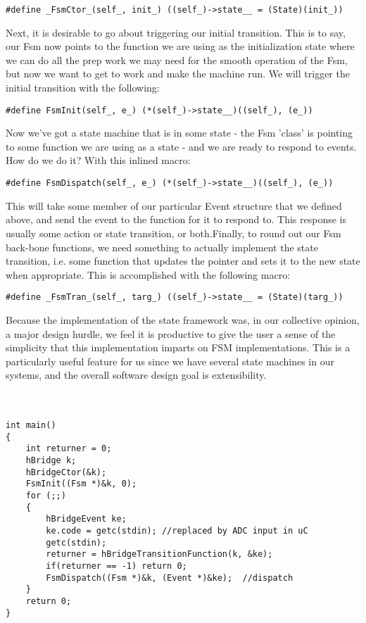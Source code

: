 \begin{lstlisting}
#define _FsmCtor_(self_, init_) ((self_)->state__ = (State)(init_))
\end{lstlisting}

Next, it is desirable to go about triggering our initial transition. This is to say, our Fsm now points to the function we are using as the initialization state where we can do all the prep work we may need for the smooth operation of the Fsm, but now we want to get to work and make the machine run. We will trigger the initial transition with the following:

\begin{lstlisting}
#define FsmInit(self_, e_) (*(self_)->state__)((self_), (e_))
\end{lstlisting}

Now we've got a state machine that is in some state - the Fsm 'class' is pointing to some function we are using as a state - and we are ready to respond to events. How do we do it? With this inlined macro:

\begin{lstlisting}
#define FsmDispatch(self_, e_) (*(self_)->state__)((self_), (e_))
\end{lstlisting}


This will take some member of our particular Event structure that we defined above, and send the event to the function for it to respond to. This response is usually some action or state transition, or both.Finally, to round out our Fsm back-bone functions, we need something to actually implement the state transition, i.e. some function that updates the pointer and sets it to the new state when appropriate. This is accomplished with the following macro:
\begin{lstlisting}
#define _FsmTran_(self_, targ_) ((self_)->state__ = (State)(targ_))
\end{lstlisting}
Because the implementation of the state framework was, in our collective opinion, a major design hurdle, we feel it is productive to give the user a sense of the simplicity that this implementation imparts on FSM implementations. This is a particularly useful feature for us since we have several state machines in our systems, and the overall software design goal is extensibility.  
\\
\\
\\
\begin{lstlisting}
int main()
{
    int returner = 0;
    hBridge k;
    hBridgeCtor(&k);
    FsmInit((Fsm *)&k, 0);
    for (;;)
    {
        hBridgeEvent ke;                   
        ke.code = getc(stdin); //replaced by ADC input in uC           
        getc(stdin);                      
        returner = hBridgeTransitionFunction(k, &ke);
        if(returner == -1) return 0;
        FsmDispatch((Fsm *)&k, (Event *)&ke);  //dispatch
    }
    return 0;
}
\end{lstlisting}
\hfill \break
\hfill \break
 

